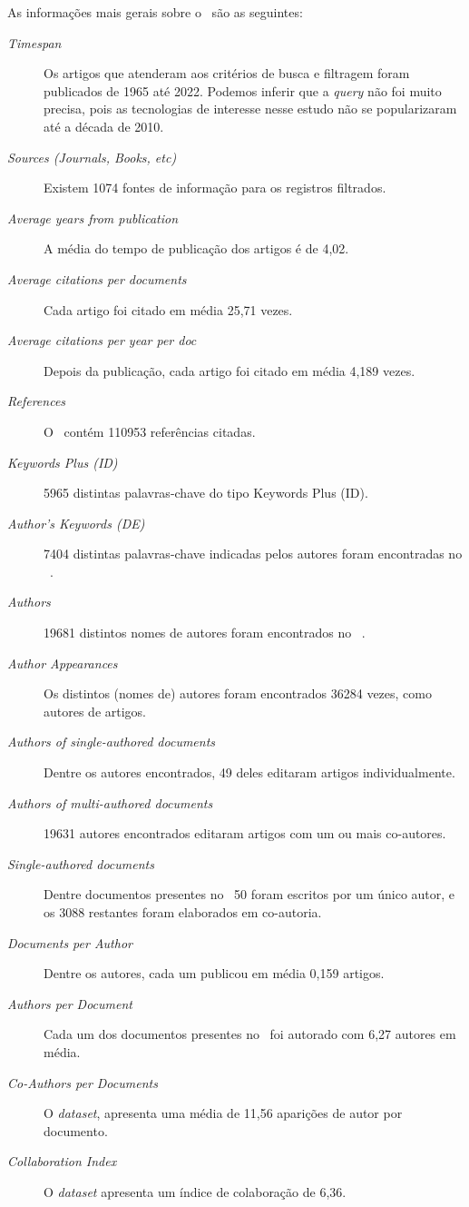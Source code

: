 As informações mais gerais sobre o \dataset\ são as seguintes:
\begin{description}
    \item [\textit{Timespan}] Os artigos que atenderam aos critérios de busca e filtragem foram publicados de 1965 até 2022. Podemos inferir que a \textit{query} não foi muito precisa, pois as tecnologias de interesse nesse estudo não se popularizaram até a década de 2010.
    \item [\textit{Sources (Journals, Books, etc)}] Existem 1074 fontes de informação para os registros filtrados.
    \item [\textit{Average years from publication}] A média do tempo de publicação dos artigos é de 4,02.
    \item [\textit{Average citations per documents}] Cada artigo foi citado em média 25,71 vezes.
    \item [\textit{Average citations per year per doc}] Depois da publicação, cada artigo foi citado em média 4,189 vezes.
    \item [\textit{References}] O \dataset\ contém 110953 referências citadas.
    \item [\textit{Keywords Plus (ID)}] 5965 distintas palavras-chave do tipo Keywords Plus (ID). 
    \item [\textit{Author's Keywords (DE)}] 7404 distintas palavras-chave indicadas pelos autores foram encontradas no \dataset\ .
    \item [\textit{Authors}] 19681 distintos nomes de autores foram encontrados no \dataset\ .
    \item [\textit{Author Appearances}] Os distintos (nomes de) autores foram encontrados 36284 vezes, como autores de artigos.
    \item [\textit{Authors of single-authored documents}] Dentre os autores encontrados, 49 deles editaram artigos individualmente.
    \item [\textit{Authors of multi-authored documents}] 19631 autores encontrados editaram artigos com um ou mais co-autores.
    \item [\textit{Single-authored documents}] Dentre documentos presentes no \dataset\, 50 foram escritos por um único autor, e os 3088 restantes foram elaborados em co-autoria.
    \item [\textit{Documents per Author}] Dentre os autores, cada um publicou em média 0,159 artigos.
    \item [\textit{Authors per Document}] Cada um dos documentos presentes no \dataset\ foi autorado com 6,27 autores em média.
    \item [\textit{Co-Authors per Documents}] O \textit{dataset}, apresenta uma média de 11,56 aparições de autor por documento.
    \item [\textit{Collaboration Index}] O \textit{dataset} apresenta um índice de colaboração de 6,36. 
\end{description}

